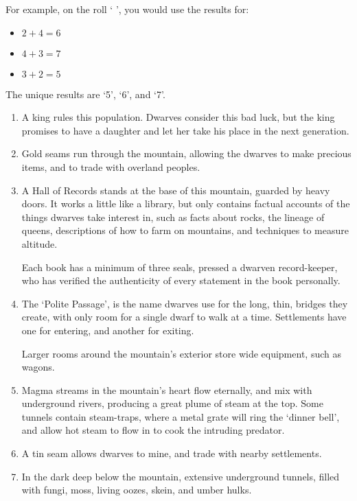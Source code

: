 \begin{multicols}{2}
\begin{exampletext}
  For example, on the roll `  ', you would use the results for:

  \begin{itemize}
    \item
    $2+4 = 6$
    \item
    $4+3 = 7$
    \item
    $3+2 = 5$
  \end{itemize}

  The unique results are `5', `6', and `7'.

\end{exampletext}

\begin{enumerate}
  \item
  A king rules this population.
  Dwarves consider this bad luck, but the king promises to have a daughter and let her take his place in the next generation.%
  \item
  Gold seams run through the mountain, allowing the dwarves to make precious items, and to trade with overland peoples.
  \item
  A Hall of Records stands at the base of this mountain, guarded by heavy doors.
  It works a little like a library, but only contains factual accounts of the things dwarves take interest in, such as facts about rocks, the lineage of queens, descriptions of how to farm on mountains, and techniques to measure altitude.

  Each book has a minimum of three seals, pressed a dwarven record-keeper, who has verified the authenticity of every statement in the book personally.
  \item
  The `Polite Passage', is the name dwarves use for the long, thin, bridges they create, with only room for a single dwarf to walk at a time.
  Settlements have one for entering, and another for exiting.

  Larger rooms around the mountain's exterior store wide equipment, such as wagons.
  \item
  Magma streams in the mountain's heart flow eternally, and mix with underground rivers, producing a great plume of steam at the top.
  Some tunnels contain steam-traps, where a metal grate will ring the `dinner bell', and allow hot steam to flow in to cook the intruding predator.
  \item
  A tin seam allows dwarves to mine, and trade with nearby settlements.
  \item
  In the dark \gls{deep} below the mountain, extensive underground tunnels, filled with fungi, moss, living oozes, skein, and umber hulks.


\end{enumerate}
\end{multicols}
